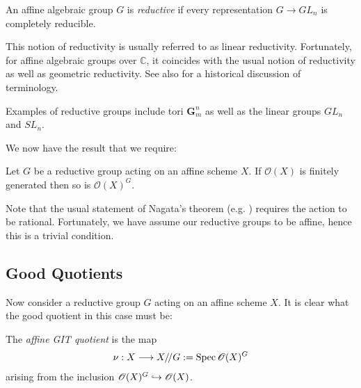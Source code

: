 \documentclass[12pt]{ociamthesis}  %
\begin{document}
\begin{definition}
  An affine algebraic group $G$ is \emph{reductive} if every
  representation $G\to GL_n$ is completely reducible.
\end{definition}

This notion of reductivity is usually referred to as linear
reductivity. Fortunately, for affine algebraic groups over $\mathbb C$,
it coincides with the usual notion of reductivity as well as
geometric reductivity. \cite[Theorem 4.6]{hoskins2016} See also
\cite[40-42]{newstead1978} for a historical discussion of terminology.

\begin{example}
  Examples of reductive groups include tori $\mathbf G_m^n$ as well
  as the linear groups $GL_n$ and $SL_n$.
\end{example}

We now have the result that we require:

\begin{theorem}[Nagata]
  Let $G$ be a reductive group acting on an affine scheme $X$.
  If $\mathscr O(X)$ is finitely generated then so is $\mathscr O(X)^G$.
\end{theorem}

Note that the usual statement of Nagata's theorem
(e.g. \cite[Theorem 3.4]{newstead1978}) requires the action to be rational.
Fortunately, we have assume our reductive groups to be affine, hence
this is a trivial condition. \cite[Lemma 3.8]{hoskins2016}

\subsection{Good Quotients}\label{sec:affine_good_quotients}

Now consider a reductive group $G$ acting on an affine scheme $X$. It is
clear what the good quotient in this case must be:

\begin{definition}
  The \emph{affine GIT quotient} is the map
  \begin{align*}
    \nu : X \longrightarrow X/\!/ G := \operatorname{Spec}\mathscr O(X)^G
  \end{align*}
  arising from the inclusion $\mathscr O(X)^G \hookrightarrow \mathscr O(X)$.
\end{definition}
\end{document}

